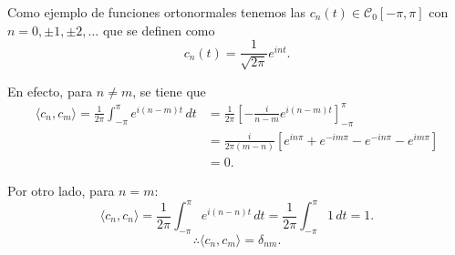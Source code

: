 \begin{ejemplo}
Como ejemplo de funciones ortonormales tenemos las $c_n(t) \in \mathcal{C}_0[-\pi,\pi]$ con $n = 0, \pm 1, \pm 2, \dots$ que se definen como
$$c_n(t) = \frac{1}{\sqrt{2\pi}} e^{i nt}.$$

En efecto, para $n \neq m$, se tiene que
\begin{align*}
    \langle c_n , c_m \rangle = \frac{1}{2\pi} \int_{-\pi}^{\pi} e^{i(n-m)t} \,dt &= \frac{1}{2\pi} \left[ -\frac{i}{n-m} e^{i(n-m) t}\right]_{-\pi}^{\pi} \\
    &= \frac{i}{2\pi(m-n)} [e^{i n\pi} + e^{-i m \pi} - e^{-in \pi} - e^{im \pi}] \\
    &= 0.
\end{align*}

Por otro lado, para $n = m$:
\begin{equation*}
  \langle c_n , c_n \rangle =\frac{1}{2\pi} \int_{-\pi}^{\pi} e^{i(n-n)t} \,dt = \frac{1}{2\pi} \int_{-\pi}^{\pi} 1 \,dt = 1.
\end{equation*}
$$\therefore  \langle c_n , c_m \rangle = \delta_{nm}.$$
\end{ejemplo}


